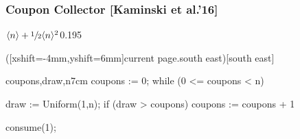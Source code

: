 \documentclass[
11pt,
usepdftitle=false,
aspectratio=169,
xcolor={table,usenames,dvipsnames},
]{beamer}
\begin{document}
    \begin{frame}[t,fragile]
    \frametitle{Coupon Collector [Kaminski et al.'16]}

  {$\langle n \rangle + \sfrac{1}{2} \langle n \rangle^2$}{0.195}
  {\notsupported}{}
  {\notsupported}{}

  \vspace{-6mm}
  \begin{overlayarea}{6.5cm}{4cm}
    \begin{center}
    \end{center}
  \end{overlayarea}

  \begin{floating}([xshift=-4mm,yshift=6mm]current page.south east)[south east]
\begin{codebox}{coupons,draw,n}{7cm}
 coupons := 0;
 while (0 <= coupons < n) {

   draw := Uniform(1,n);
   if (draw > coupons) {
     coupons := coupons + 1
   }

   consume(1);
}
\end{codebox}
  \end{floating}
\end{frame}
\end{document}
